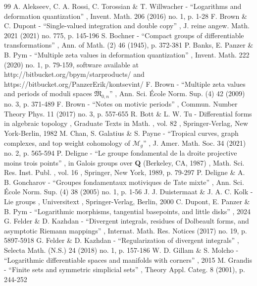 \documentclass[10pt]{amsart}
\theoremstyle{definition}
\theoremstyle{remark}
\begin{document}
\begin{thebibliography}{99}
 A. Alekseev, C. A. Rossi, C. Torossian \& T. Willwacher - “Logarithms and deformation quantization” , Invent. Math. 206 (2016) no. 1, p. 1-28
 F. Brown \& C. Dupont - “Single-valued integration and double copy” , J. reine angew. Math. 2021 (2021) no. 775, p. 145-196
 S. Bochner - “Compact groups of differentiable transformations” , Ann. of Math. (2) 46 (1945), p. 372-381
 P. Banks, E. Panzer \& B. Pym - “Multiple zeta values in deformation quantization” , Invent. Math. 222 (2020) no. 1, p. 79-159, software available at http://bitbucket.org/bpym/starproducts/ and https://bitbucket.org/PanzerErik/kontsevint/
 F. Brown - “Multiple zeta values and periods of moduli spaces $\overline{\mathfrak{M}}_{0,n}$” , Ann. Sci. École Norm. Sup. (4) 42 (2009) no. 3, p. 371-489
 F. Brown - “Notes on motivic periods” , Commun. Number Theory Phys. 11 (2017) no. 3, p. 557-655
 R. Bott \& L. W. Tu - Differential forms in algebraic topology , Graduate Texts in Math. , vol. 82 , Springer-Verlag, New York-Berlin, 1982
 M. Chan, S. Galatius \& S. Payne - “Tropical curves, graph complexes, and top weight cohomology of $\mathcal{M}_g$” , J. Amer. Math. Soc. 34 (2021) no. 2, p. 565-594
 P. Deligne - “Le groupe fondamental de la droite projective moins trois points” , in Galois groups over ${\mathbf{Q}}$ (Berkeley, CA, 1987) , Math. Sci. Res. Inst. Publ. , vol. 16 , Springer, New York, 1989, p. 79-297
 P. Deligne \& A. B. Goncharov - “Groupes fondamentaux motiviques de Tate mixte” , Ann. Sci. École Norm. Sup. (4) 38 (2005) no. 1, p. 1-56
 J. J. Duistermaat \& J. A. C. Kolk - Lie groups , Universitext , Springer-Verlag, Berlin, 2000
 C. Dupont, E. Panzer \& B. Pym - “Logarithmic morphisms, tangential basepoints, and little disks” , 2024
 G. Felder \& D. Kazhdan - “Divergent integrals, residues of Dolbeault forms, and asymptotic Riemann mappings” , Internat. Math. Res. Notices (2017) no. 19, p. 5897-5918
 G. Felder \& D. Kazhdan - “Regularization of divergent integrals” , Selecta Math. (N.S.) 24 (2018) no. 1, p. 157-186
 W. D. Gillam \& S. Molcho - “Logarithmic differentiable spaces and manifolds with corners” , 2015
 M. Grandis - “Finite sets and symmetric simplicial sets” , Theory Appl. Categ. 8 (2001), p. 244-252

\end{thebibliography}
\end{document}
